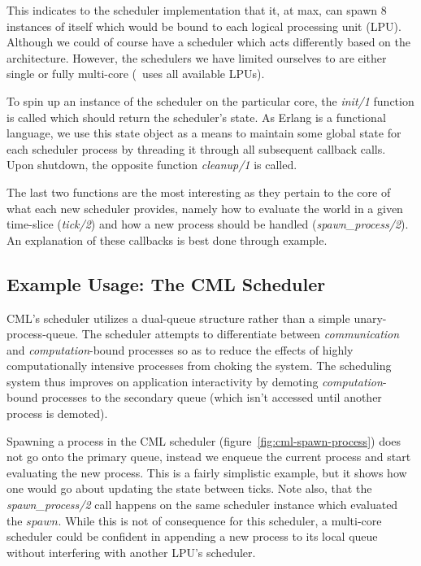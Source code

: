 \noindent
This indicates to the scheduler implementation that it, at max, can spawn $8$
instances of itself which would be bound to each logical processing unit (LPU).
Although we could of course have a scheduler which acts differently based on the
architecture. However, the schedulers we have limited ourselves to are either
single or fully multi-core (\ie~uses all available LPUs).

To spin up an instance of the scheduler on the particular core, the 
\emph{init/1} function is called which should return the scheduler's state. 
As Erlang is a functional language, we use this state object as a means to
maintain some global state for each scheduler process by threading it through
all subsequent callback calls. Upon shutdown, the opposite function 
\emph{cleanup/1} is called.

The last two functions are the most interesting as they pertain to the core of
what each new scheduler provides, namely how to evaluate the world in a given
time-slice (\emph{tick/2}) and how a new process should be handled 
(\emph{spawn\_process/2}). An explanation of these callbacks is best done 
through example.

\subsection{Example Usage: The CML Scheduler}\label{sec:example the cml scheduler}

CML's scheduler utilizes a dual-queue structure rather than
a simple unary-process-queue. The scheduler attempts to differentiate between
{\em communication} and {\em computation}-bound processes so as to reduce the
effects of highly computationally intensive processes from choking the system.
The scheduling system thus improves on application interactivity by demoting 
{\em computation}-bound processes to the secondary queue (which isn't accessed
until another process is demoted).

Spawning a process in the CML scheduler (figure~\ref{fig:cml-spawn-process}) 
does not go onto the primary queue, instead we enqueue the current process and 
start evaluating the new process. This is a fairly simplistic example, but it 
shows how one would go about updating the state between ticks. Note also, that
the \emph{spawn\_process/2} call happens on the same scheduler instance which
evaluated the $spawn$. While this is not of consequence for this scheduler, a
multi-core scheduler could be confident in appending a new process to its local
queue without interfering with another LPU's scheduler.

